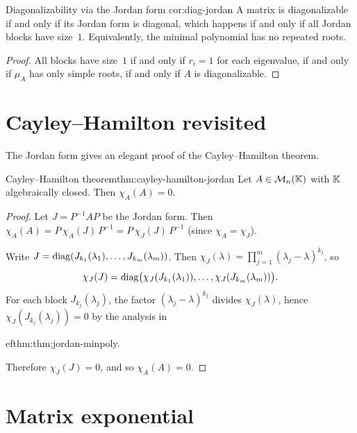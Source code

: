 \begin{corollary}{Diagonalizability via the Jordan form}%
{cor:diag-jordan}
A matrix is diagonalizable if and only if its Jordan form is diagonal,
which happens if and only if all Jordan blocks have size~$1$.
Equivalently, the minimal polynomial has no repeated roots.
\end{corollary}

\begin{proof}
All blocks have size~$1$ if and only if $r_i = 1$ for each
eigenvalue, if and only if $\mu_A$ has only simple roots, if and only
if $A$ is diagonalizable.
\end{proof}


\section{Cayley--Hamilton revisited}\label{sec:cayley-hamilton-jordan}

The Jordan form gives an elegant proof of the Cayley--Hamilton theorem.

\begin{theorem}{Cayley--Hamilton theorem}{thm:cayley-hamilton-jordan}
Let $A \in \mathcal{M}_n({\mathbb{K}})$ with ${\mathbb{K}}$ algebraically closed.  Then
$\chi_A(A) = 0$.
\end{theorem}

\begin{proof}
Let $J = P^{-1}AP$ be the Jordan form.  Then
$\chi_A(A) = P\,\chi_A(J)\,P^{-1} = P\,\chi_J(J)\,P^{-1}$
(since $\chi_A = \chi_J$).

Write $J = \operatorname{diag}(J_{k_1}(\lambda_1), \ldots, J_{k_m}(\lambda_m))$.
Then $\chi_J(\lambda) = \prod_{j=1}^m (\lambda_j - \lambda)^{k_j}$,
so
\[
  \chi_J(J) = \operatorname{diag}\bigl(\chi_J(J_{k_1}(\lambda_1)), \ldots,
    \chi_J(J_{k_m}(\lambda_m))\bigr).
\]
For each block $J_{k_j}(\lambda_j)$, the factor
$(\lambda_j - \lambda)^{k_j}$ divides $\chi_J(\lambda)$, hence
$\chi_J(J_{k_j}(\lambda_j)) = 0$ by the analysis in

ef{thm:thm:jordan-minpoly}.

Therefore $\chi_J(J) = 0$, and so $\chi_A(A) = 0$.
\end{proof}


\section{Matrix exponential}\label{sec:matrix-exponential}

